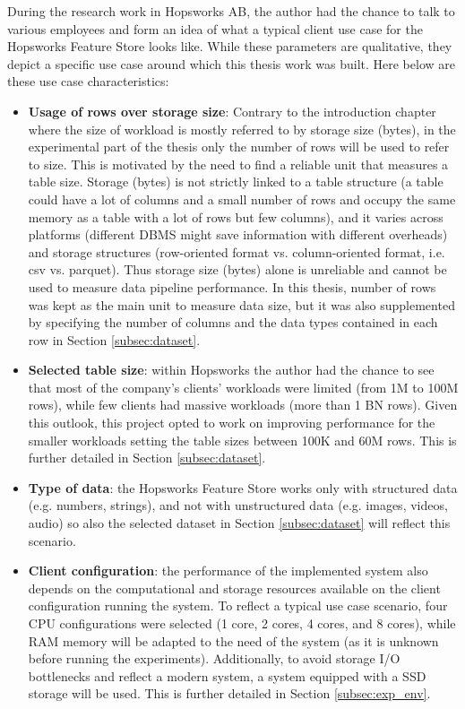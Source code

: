 During the research work in Hopsworks AB, the author had the chance to talk to various employees and form an idea of what a typical client use case for the Hopsworks Feature Store looks like. While these parameters are qualitative, they depict a specific use case around which this thesis work was built. Here below are these use case characteristics:
\begin{itemize}
  \item \textbf{Usage of rows over storage size}: Contrary to the introduction chapter where the size of workload is mostly referred to by storage size (bytes), in the experimental part of the thesis only the number of rows will be used to refer to size. This is motivated by the need to find a reliable unit that measures a table size. Storage (bytes) is not strictly linked to a table structure (a table could have a lot of columns and a small number of rows and occupy the same memory as a table with a lot of rows but few columns), and it varies across platforms (different \gls{DBMS} might save information with different overheads) and storage structures (row-oriented format vs. column-oriented format, i.e. csv vs. parquet). Thus storage size (bytes) alone is unreliable and cannot be used to measure data pipeline performance. In this thesis, number of rows was kept as the main unit to measure data size, but it was also supplemented by specifying the number of columns and the data types contained in each row in Section \ref{subsec:dataset}.
  \item \textbf{Selected table size}: within Hopsworks the author had the chance to see that most of the company's clients' workloads were limited (from 1M to 100M rows), while few clients had massive workloads (more than 1 BN rows). Given this outlook, this project opted to work on improving performance for the smaller workloads setting the table sizes between 100K and 60M rows. This is further detailed in Section \ref{subsec:dataset}.
  \item \textbf{Type of data}: the Hopsworks Feature Store works only with structured data (e.g. numbers, strings), and not with unstructured data (e.g. images, videos, audio) so also the selected dataset in Section \ref{subsec:dataset} will reflect this scenario.
  \item \textbf{Client configuration}: the performance of the implemented system also depends on the computational and storage resources available on the client configuration running the system. To reflect a typical use case scenario, four \gls{CPU} configurations were selected (1 core, 2 cores, 4 cores, and 8 cores), while \gls{RAM} memory will be adapted to the need of the system (as it is unknown before running the experiments). Additionally, to avoid storage I/O bottlenecks and reflect a modern system, a system equipped with a \gls{SSD} storage will be used. This is further detailed in Section \ref{subsec:exp_env}.
\end{itemize}


